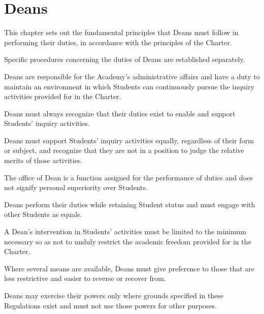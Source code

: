 \newpage
\chapter{Deans}
\begin{articles}
  \item This chapter sets out the fundamental principles that Deans must follow in performing their duties, in accordance with the principles of the Charter.
  \begin{paragraphs}
    \item Specific procedures concerning the duties of Deans are established separately.
  \end{paragraphs}
  \item Deans are responsible for the Academy's administrative affairs and have a duty to maintain an environment in which Students can continuously pursue the inquiry activities provided for in the Charter.
  \item Deans must always recognize that their duties exist to enable and support Students' inquiry activities.
  \begin{paragraphs}
    \item Deans must support Students' inquiry activities equally, regardless of their form or subject, and recognize that they are not in a position to judge the relative merits of those activities.
  \end{paragraphs}
  \item The office of Dean is a function assigned for the performance of duties and does not signify personal superiority over Students.
  \begin{paragraphs}
    \item Deans perform their duties while retaining Student status and must engage with other Students as equals.
  \end{paragraphs}
  \item A Dean's intervention in Students' activities must be limited to the minimum necessary so as not to unduly restrict the academic freedom provided for in the Charter.
  \begin{paragraphs}
    \item Where several means are available, Deans must give preference to those that are less restrictive and easier to reverse or recover from.
    \item Deans may exercise their powers only where grounds specified in these Regulations exist and must not use those powers for other purposes.
  \end{paragraphs}

\end{articles}
